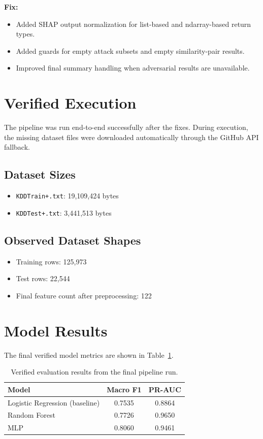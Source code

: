 \documentclass[11pt]{article}
\begin{document}
\textbf{Fix:}
\begin{itemize}[leftmargin=*]
    \item Added SHAP output normalization for list-based and ndarray-based return types.
    \item Added guards for empty attack subsets and empty similarity-pair results.
    \item Improved final summary handling when adversarial results are unavailable.
\end{itemize}

\section{Verified Execution}
The pipeline was run end-to-end successfully after the fixes. During execution, the missing dataset files were downloaded automatically through the GitHub API fallback.

\subsection{Dataset Sizes}
\begin{itemize}[leftmargin=*]
    \item \texttt{KDDTrain+.txt}: 19,109,424 bytes
    \item \texttt{KDDTest+.txt}: 3,441,513 bytes
\end{itemize}

\subsection{Observed Dataset Shapes}
\begin{itemize}[leftmargin=*]
    \item Training rows: 125,973
    \item Test rows: 22,544
    \item Final feature count after preprocessing: 122
\end{itemize}

\section{Model Results}
The final verified model metrics are shown in Table~\ref{tab:results}.

\begin{table}[h]
\centering
\begin{tabular}{>{\raggedright\arraybackslash}p{3.6in}cc}
\toprule
Model & Macro F1 & PR-AUC \\
\midrule
Logistic Regression (baseline) & 0.7535 & 0.8864 \\
Random Forest & 0.7726 & 0.9650 \\
MLP & 0.8060 & 0.9461 \\
\bottomrule
\end{tabular}
\caption{Verified evaluation results from the final pipeline run.}
\label{tab:results}
\end{table}
\end{document}
